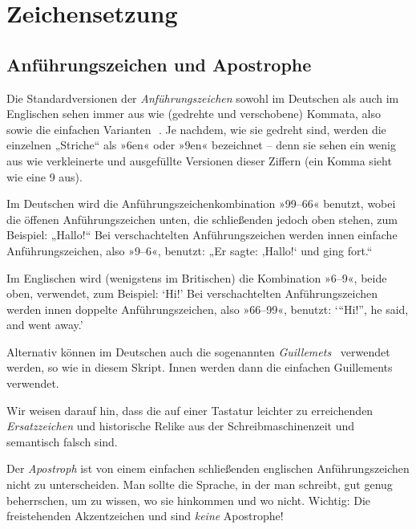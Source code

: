 \chapter{Zeichensetzung}

\lipsum[1]

\section{Anführungszeichen und Apostrophe}

Die Standardversionen der \emph{Anführungszeichen} sowohl im Deutschen
als auch im Englischen sehen immer aus wie (gedrehte und verschobene)
Kommata, also \,\, sowie die einfachen
Varianten \,\,. Je nachdem, wie sie gedreht
sind, werden die einzelnen „Striche“ als »6en« oder »9en« bezeichnet
-- denn sie sehen ein wenig aus wie verkleinerte und ausgefüllte
Versionen dieser Ziffern (ein Komma \Char{,} sieht wie eine 9 aus).

Im Deutschen wird die Anführungszeichenkombination »99–66« benutzt, wobei die
öffenen Anführungszeichen unten, die schließenden jedoch oben stehen, zum
Beispiel: „Hallo!“ Bei verschachtelten Anführungszeichen werden innen einfache
Anführungszeichen, also »9–6«, benutzt: „Er sagte: ‚Hallo!{‘} und ging fort.“

Im Englischen wird (wenigstens im Britischen) die Kombination
»6–9«, beide oben, verwendet, zum Beispiel: ‘Hi!’ Bei verschachtelten
Anführungszeichen werden innen doppelte Anführungszeichen, also »66–99«,
benutzt: ‘“Hi!”, he said, and went away.’

Alternativ können im Deutschen auch die sogenannten \emph{Guillemets}
\, verwendet werden, so wie in diesem Skript. Innen werden dann
die einfachen Guillements \, verwendet.

Wir weisen darauf hin, dass die auf einer Tastatur leichter zu erreichenden
\emph{Ersatzzeichen}  und \Char{\textquotesingle} historische Relike aus
der Schreibmaschinenzeit und semantisch falsch sind.

Der \emph{Apostroph}  ist von einem einfachen schließenden englischen
Anführungszeichen nicht zu unterscheiden. Man sollte die Sprache, in der man
schreibt, gut genug beherrschen, um zu wissen, wo sie hinkommen und wo
nicht. Wichtig: Die freistehenden Akzentzeichen
\Char{\textasciigrave} und  sind \emph{keine} Apostrophe!


